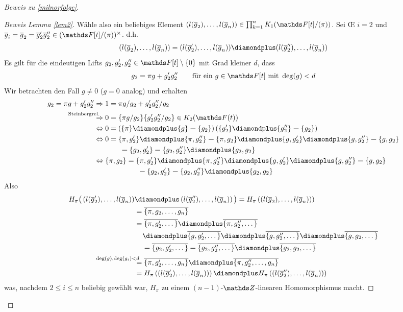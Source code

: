 \documentclass[ngerman,fontsize=11pt, paper=a4, parskip=half, titlepage=true, toc=bib]{scrartcl}
\begin{document}
\begin{proof}[Beweis zu \ref{milnorfolge}]
\begin{proof}[Beweis Lemma \ref{lem2}]
    Wähle also ein beliebiges Element 
    $\left(l(\ov g_2),\dotsc,l(\ov g_n)\right)\in\prod_{k=1}^n\K_1(\Ftpi)$.
    Sei \OE{} $i=2$ und $\ov g_i=\ov g_2=\ov g_2'\ov g_2''\in(\Ftpi)^\times$.
    d.h. 
    \begin{gather*}
      (l(\ov g_2),\dotsc, l(\ov g_n))
      =(l(\ov g_2'),\dotsc, l(\ov g_n))\p(l(\ov g_2''),\dotsc,l(\ov g_n))
    \end{gather*}
    Es gilt für die eindeutigen Lifts
    $g_2,g_2',g_2''\in\F[t]\setminus\{0\}$ mit Grad kleiner $d$, dass 
    \begin{gather*}
      g_2=\pi g + g_2'g_2''
      \qquad\text{für ein }g\in\F[t]\text{ mit }\deg(g)<d
    \end{gather*}
    Wir betrachten den Fall $g\neq 0$ ($g=0$ analog)
    und erhalten
    \begin{align*}
      g_2=\pi g + g_2'g_2''
      &\Rightarrow
        1 = \pi g/g_2 + g_2'g_2''/g_2\\
      &\overset{\mathllap{\text{Steinbergrel.}}}{\Rightarrow}
        0 = \{\pi g/g_2\}\{g_2'g_2''/g_2\} \in\K_2(\Ft)\\
      &\Leftrightarrow 
        0= \left( \{\pi\}\p \{g\}\m \{g_2\} \right)
        \left( \{g_2'\}\p \{g_2''\}\m \{g_2\}\right)\\
      &\Leftrightarrow 
        0=\{\pi,g_2'\}\p\{\pi,g_2''\}\m \{\pi,g_2\}
        \p\{g,g_2'\}\p\{g,g_2''\}\m\{g,g_2\}\\
      &\phantom{\Leftrightarrow 0=\{}
        \m\{g_2,g_2'\}\m\{g_2,g_2''\}\p\{g_2,g_2\}\\
      &\Leftrightarrow 
        \{\pi,g_2\}=\{\pi,g_2'\}\p\{\pi,g_2''\}
        \p\{g,g_2'\}\p\{g,g_2''\}\m\{g,g_2\}\\
      &\phantom{\Leftrightarrow\{\pi,g_2\}=\{}
        \m\{g_2,g_2'\}\m\{g_2,g_2''\}\p\{g_2,g_2\}
    \end{align*}
    Also
    \begin{align*}
      H_\pi\big(
      \left( l(\ov g_2'),\dotsc,l(\ov g_n)\right)
      &\p \left( l(\ov g_2''),\dotsc,l(\ov g_n) \right)
        \big)
        =H_\pi\left( \left( l(\ov g_2),\dotsc,l(\ov g_n) \right)
        \right)\\
      &=\ov{\{\pi,g_2,\dotsc,g_n\}}\\
      &=\ov{\{\pi,g_2',\dotsc\}} \p \ov{\{\pi,g_2'',\dotsc\}}\\
      &\phantom{=~}\p \ov{\{g,g_2',\dotsc\}}\p\ov{\{g,g_2'',\dotsc\}}
        \p \ov{\{g,g_2,\dotsc\}}\\
      &\phantom{=~}\m\ov{\{g_2,g_2',\dotsc\}}\m\ov{\{g_2,g_2'',\dotsc\}}
        \p\ov{\{g_2,g_2,\dotsc\}}\\
      &\overset{\mathllap{\deg(g),\deg(g_i)<d}}{=}
        \ov{\{\pi,g_2',\dotsc,g_n\}} \p \ov{\{\pi,g_2'',\dotsc,g_n\}}\\
      &=H_\pi\left(\left(l(\ov g_2'),\dotsc,l(\ov g_n)\right)\right)
        \p H_\pi\left(\left(l(\ov g_2''),\dotsc,l(\ov g_n)\right)\right)     
    \end{align*}
    was, nachdem $2\leq i\leq n$ beliebig gewählt war, $H_\pi$ zu
    einem $(n-1)$-$\Z$-linearen Homomorphismus macht.


\end{proof}
\end{proof}
\end{document}
